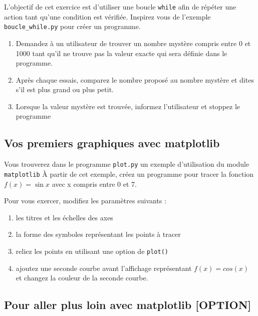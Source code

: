 L'objectif de  cet exercice  est d'utiliser une  boucle \texttt{while}
afin  de  répéter  une  action tant  qu'une  condition  est  vérifiée.
Inspirez  vous de  l'exemple \texttt{boucle\_while.py}  pour créer  un
programme.

\begin{enumerate}
\item Demandez à  un utilisateur de trouver un  nombre mystère compris
  entre 0 et 1000  tant qu'il ne trouve pas la  valeur exacte qui sera
  définie dans le programme.

\item  Après  chaque essais,  comparez  le  nombre proposé  au  nombre
  mystère et dites s'il est plus grand ou plus petit.

\item Lorsque la valeur mystère est trouvée, informez l'utilisateur et
  stoppez le programme

\end{enumerate}



\subsection{Vos premiers graphiques avec matplotlib}

Vous  trouverez   dans  le   programme  \texttt{plot.py}   un  exemple
d'utilisation du  module \texttt{matplotlib} À partir  de cet exemple,
créez  un programme  pour  tracer  la fonction  $f(x)=\sin  x$ avec  x
compris entre 0 et 7.

Pour vous exercer, modifiez les paramètres suivants :

\begin{enumerate}
\item les titres et les échelles des axes

\item la forme des  symboles représentant les points à tracer

\item reliez les points en utilisant une option de \texttt{plot()}

\item ajoutez une seconde courbe avant l'affichage représentant $f(x)=cos(x)$ et changez la couleur
  de la seconde courbe.


\end{enumerate}

\subsection{Pour aller plus loin avec matplotlib [OPTION]}

